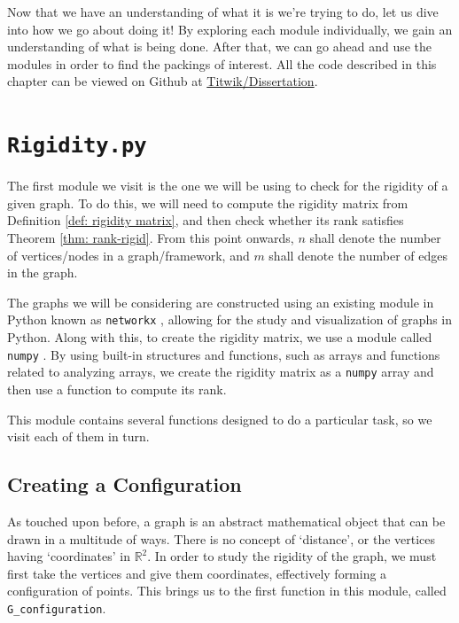 \begin{flushleft}
Now that we have an understanding of what it is we're trying to do, let us dive into how we go about doing it! By exploring each module individually, we gain an understanding of what is being done. After that, we can go ahead and use the modules in order to find the packings of interest. All the code described in this chapter can be viewed on Github at \href{https://github.com/Titwik/Dissertation}{Titwik/Dissertation}.
\end{flushleft}

\section{\texttt{Rigidity.py}}

\begin{flushleft}
The first module we visit is the one we will be using to check for the rigidity of a given graph. To do this, we will need to compute the rigidity matrix from Definition \ref{def: rigidity matrix}, and then check whether its rank satisfies Theorem \ref{thm: rank-rigid}. From this point onwards, $n$ shall denote the number of vertices/nodes in a graph/framework, and $m$ shall denote the number of edges in the graph. 
\end{flushleft}

\begin{flushleft}
The graphs we will be considering are constructed using an existing module in Python known as \texttt{networkx} \cite{networkx}, allowing for the study and visualization of graphs in Python. Along with this, to create the rigidity matrix, we use a module called \texttt{numpy} \cite{numpy}. By using built-in structures and functions, such as arrays and functions related to analyzing arrays, we create the rigidity matrix as a \texttt{numpy} array and then use a function to compute its rank.
\end{flushleft}

\begin{flushleft}
This module contains several functions designed to do a particular task, so we visit each of them in turn.
\end{flushleft}

\subsection{Creating a Configuration}

\begin{flushleft}
As touched upon before, a graph is an abstract mathematical object that can be drawn in a multitude of ways. There is no concept of `distance', or the vertices having `coordinates' in $\mathbb{R}^2$. In order to study the rigidity of the graph, we must first take the vertices and give them coordinates, effectively forming a configuration of points. This brings us to the first function in this module, called \texttt{G\_configuration}.
\end{flushleft}

